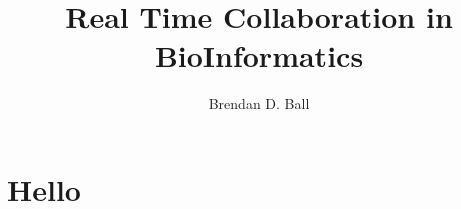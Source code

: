 \documentclass{article} %
\begin{document}
\title{Real Time Collaboration in BioInformatics} %

\author{Brendan D. Ball}

\maketitle
\section{Hello}
\autocite{nicolaescu2013browser}
\printbibliography



\end{document}
